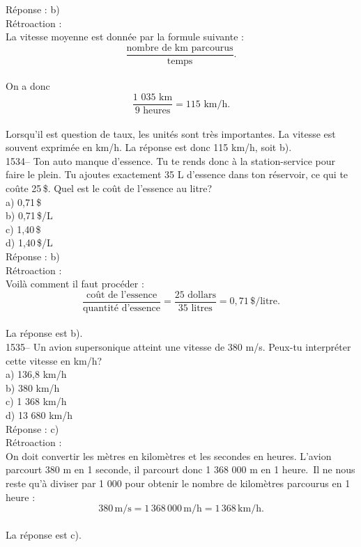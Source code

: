 R\'eponse : b)\\

R\'etroaction :\\
La vitesse moyenne est donn\'ee par la formule suivante :
$$\frac{\textrm{nombre de km parcourus}}{\textrm{temps}}.$$\\[2mm]

On a donc
$$\frac{\textrm{1 035 km}}{\textrm{9 heures}}= {\textrm{115 km/h.}}$$\\[2mm]
Lorsqu'il est question de taux, les unit\'es sont tr\`es
importantes. La vitesse est souvent exprim\'ee
en km/h. La r\'eponse est donc 115 km/h, soit b).\\

1534-- Ton auto manque d'essence. Tu te rends donc \`a la
station-service pour faire le plein. Tu ajoutes exactement
35 L d'essence dans ton r\'eservoir, ce qui te co\^ute 25\,\$. Quel est le
co\^ut de l'essence au litre?\\
a) 0,71\,\$\\
b) 0,71\,\$/L\\
c) 1,40\,\$\\
d) 1,40\,\$/L\\

R\'eponse : b)\\

R\'etroaction :\\
Voil\`a comment il faut proc\'eder : $$\frac{\textrm{co\^ut de
l'essence}}{\textrm{quantit\'e d'essence}} =\frac{\textrm{25
dollars}}{\textrm{35 litres}}
=0,71\,\$/{\textrm{litre.}}$$\\

La r\'eponse est b).\\

1535-- Un avion supersonique atteint une vitesse de 380 m/s. Peux-tu
interpr\'eter cette vitesse en km/h?\\
a) 136,8 km/h\\
b) 380 km/h\\
c) 1 368 km/h\\
d) 13 680 km/h\\

R\'eponse : c)\\

R\'etroaction :\\
On doit convertir les m\`etres en kilom\`etres et les secondes en
heures. L'avion parcourt 380 m en 1 seconde, il parcourt donc 1 368
000 m en 1 heure. \,Il ne nous reste qu'\`a diviser par 1 000 pour
obtenir le nombre de kilom\`etres parcourus en 1 heure :
$$380\,{\textrm{m/s}}=1\,368\,000\,{\textrm{m/h}}=1\,368\,{\textrm{km/h.}}$$\\
La r\'eponse est c).\\

